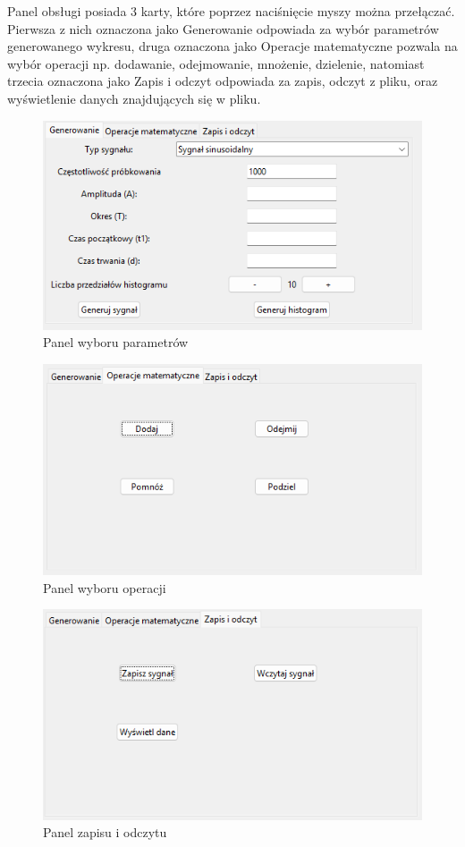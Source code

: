 \documentclass{article}
\begin{document}
Panel obsługi posiada 3 karty, które poprzez naciśnięcie myszy można przełączać.
Pierwsza z nich oznaczona jako Generowanie odpowiada za wybór parametrów generowanego
wykresu, druga oznaczona jako Operacje matematyczne pozwala na wybór operacji np. dodawanie, odejmowanie, mnożenie,
dzielenie, natomiast trzecia oznaczona jako Zapis i odczyt odpowiada za zapis, odczyt z pliku,
oraz wyświetlenie danych znajdujących się w pliku.
\FloatBarrier
\begin{figure}[h!]
    \centering
    \includegraphics[width=\textwidth]{img/generuj.png}
    \caption{Panel wyboru parametrów}
\end{figure}
\FloatBarrier
\begin{figure}[h!]
    \centering
    \includegraphics[width=\textwidth]{img/operacje.png}
    \caption{Panel wyboru operacji}
\end{figure}
\FloatBarrier
\begin{figure}[h!]
    \centering
    \includegraphics[width=\textwidth]{img/zapis.png}
    \caption{Panel zapisu i odczytu}
\end{figure}
\end{document}
